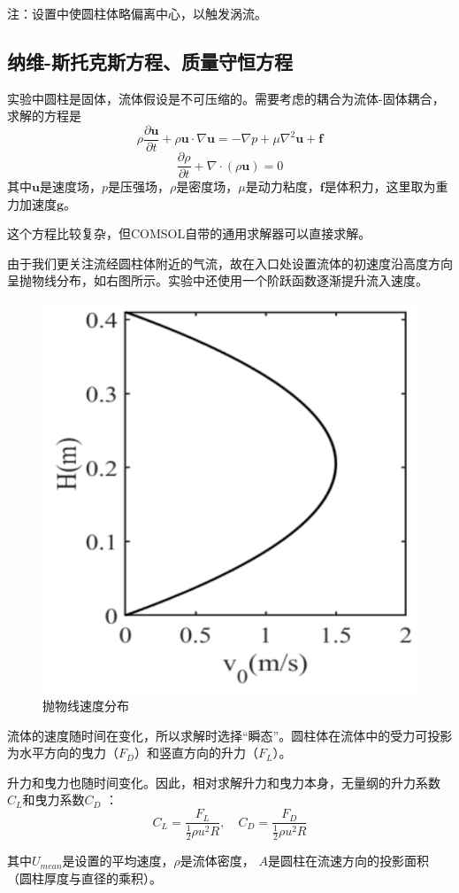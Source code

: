\documentclass[a4paper,zihao=5,UTF8,fontset=fandol]{phyreport}
\begin{document}
注：设置中使圆柱体略偏离中心，以触发涡流。

\subsection{纳维-斯托克斯方程、质量守恒方程}
实验中圆柱是固体，流体假设是不可压缩的。需要考虑的耦合为流体-固体耦合，求解的方程是
\begin{equation}
  \rho\frac{\partial \mathbf{u}}{\partial t}+\rho\mathbf{u}\cdot\nabla\mathbf{u}=-\nabla p+\mu\nabla^2\mathbf{u}+\mathbf{f}
\end{equation}
\begin{equation}
  \frac{\partial \rho}{\partial t}+\nabla\cdot(\rho\mathbf{u})=0
\end{equation}
其中$\mathbf{u}$是速度场，$p$是压强场，$\rho$是密度场，$\mu$是动力粘度，$\mathbf{f}$是体积力，这里取为重力加速度$\mathbf{g}$。

这个方程比较复杂，但COMSOL自带的通用求解器可以直接求解。

由于我们更关注流经圆柱体附近的气流，故在入口处设置流体的初速度沿高度方向呈抛物线分布，如右图所示。实验中还使用一个阶跃函数逐渐提升流入速度。
\begin{figure}[H]
  \centering
  \includegraphics[width = 0.4\linewidth]{抛物线速度分布.png}
  \caption{抛物线速度分布}
\end{figure}
流体的速度随时间在变化，所以求解时选择“瞬态”。圆柱体在流体中的受力可投影为水平方向的曳力（$F_D$）和竖直方向的升力（$F_L$）。

升力和曳力也随时间变化。因此，相对求解升力和曳力本身，无量纲的升力系数$C_L$和曳力系数$C_D$ ：
\begin{equation}
  C_L=\frac{F_L}{\frac{1}{2}\rho u^2R},\quad
  C_D=\frac{F_D}{\frac{1}{2}\rho u^2R}
  \label{eq:CLCD}
\end{equation}

其中$U_{mean}$是设置的平均速度，$\rho$是流体密度， $A$是圆柱在流速方向的投影面积（圆柱厚度与直径的乘积）。
\end{document}

